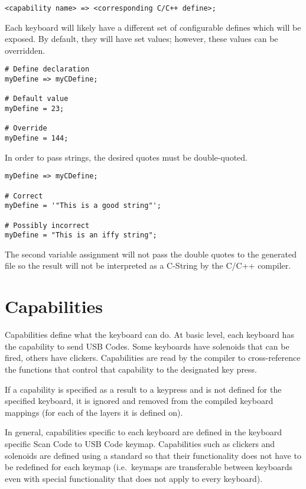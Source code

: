 \documentclass{kiibohd-template}
\begin{document}
\begin{lstlisting}
<capability name> => <corresponding C/C++ define>;
\end{lstlisting}

Each keyboard will likely have a different set of configurable defines which will be exposed.
By default, they will have set values; however, these values can be overridden.

\begin{lstlisting}
# Define declaration
myDefine => myCDefine;

# Default value
myDefine = 23;

# Override
myDefine = 144;
\end{lstlisting}

In order to pass strings, the desired quotes must be double-quoted.

\begin{lstlisting}
myDefine => myCDefine;

# Correct
myDefine = '"This is a good string"';

# Possibly incorrect
myDefine = "This is an iffy string";
\end{lstlisting}

The second variable assignment will not pass the double quotes to the generated file so the result will not be interpreted as a C-String by the C/C++ compiler.


\chapter{Capabilities}
\label{chpt:Capabilities}

Capabilities define what the keyboard can do.
At basic level, each keyboard has the capability to send USB Codes.
Some keyboards have solenoids that can be fired, others have clickers.
Capabilities are read by the compiler to cross-reference the functions that control that capability to the designated key press.

If a capability is specified as a result to a keypress and is not defined for the specified keyboard, it is ignored and removed from the compiled keyboard mappings (for each of the layers it is defined on).

In general, capabilities specific to each keyboard are defined in the keyboard specific Scan Code to USB Code keymap.
Capabilities such as clickers and solenoids are defined using a standard so that their functionality does not have to be redefined for each keymap (i.e.\ keymaps are transferable between keyboards even with special functionality that does not apply to every keyboard).
\end{document}
